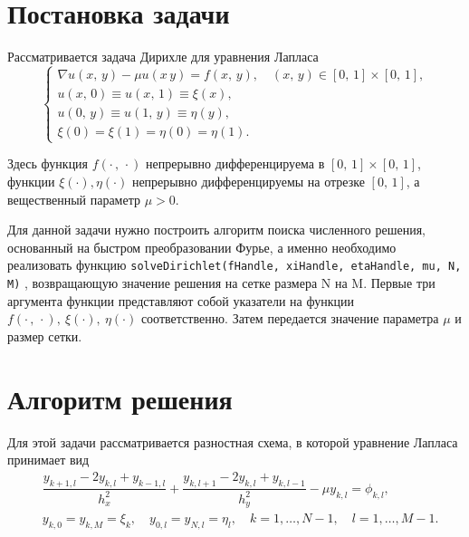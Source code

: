 \documentclass[12pt, a4paper]{article} %
\begin{document}


\tableofcontents

\section{Постановка задачи}
Рассматривается задача Дирихле для уравнения Лапласа
\begin{equation}\label{problem}
	\begin{cases}
		\nabla u\left(x, \, y\right) - \mu u\left(x\, y\right) = 
		f\left(x, \, y\right), \quad \left(x, \, y\right) \in \left[0, \, 1\right] \times \left[0, \, 1\right], \\
		u\left(x, \, 0\right) \equiv u\left(x, \, 1\right) \equiv \xi\left(x\right), \\
		u\left(0, \, y\right) \equiv u\left(1, \, y\right) \equiv \eta\left(y\right), \\ 
		\xi\left(0\right) = \xi\left(1\right) = \eta\left(0\right) = \eta\left(1\right).
	\end{cases}	
\end{equation}

Здесь функция $f\left(\cdot\, , \, \cdot\right)$ непрерывно дифференцируема в $\left[0, \, 1\right]
\times \left[0, \, 1\right]$, функции $\xi\left(\cdot\right), \eta\left(\cdot\right)$ 
непрерывно дифференцируемы на отрезке $\left[0, \, 1\right]$, а вещественный параметр $\mu > 0$.

Для данной задачи нужно построить алгоритм поиска численного решения, основанный
на быстром преобразовании Фурье, а именно необходимо реализовать функцию  
\texttt{solveDirichlet(fHandle, xiHandle, etaHandle, mu, N, M)}
, возвращающую значение решения на сетке размера N на M.
Первые три аргумента функции представляют собой указатели на функции $f\left(\cdot\, , \, \cdot\right), \ \xi\left(\cdot\right), \ \eta\left(\cdot\right)$ соответственно. Затем
передается значение параметра $\mu$ и размер сетки.


\section{Алгоритм решения}

Для этой задачи рассматривается разностная схема, в которой уравнение 
Лапласа принимает вид
\begin{equation} 
\begin{split}
&\dfrac{y_{k+1,l}-2y_{k,l}+y_{k-1,l}}{h_x^2} + 
\dfrac{y_{k,l+1}-2y_{k,l}+y_{k,l-1}}{h_y^2} - \mu y_{k,l} = \phi_{k,l}, \\ \label{approx}
&y_{k,0} = y_{k,M} = \xi_k, \quad y_{0,l} = y_{N,l} = \eta_l, \quad k = 1,\ldots,N-1, \quad l = 1,\ldots,M-1.
\end{split}
\end{equation}
\end{document}

